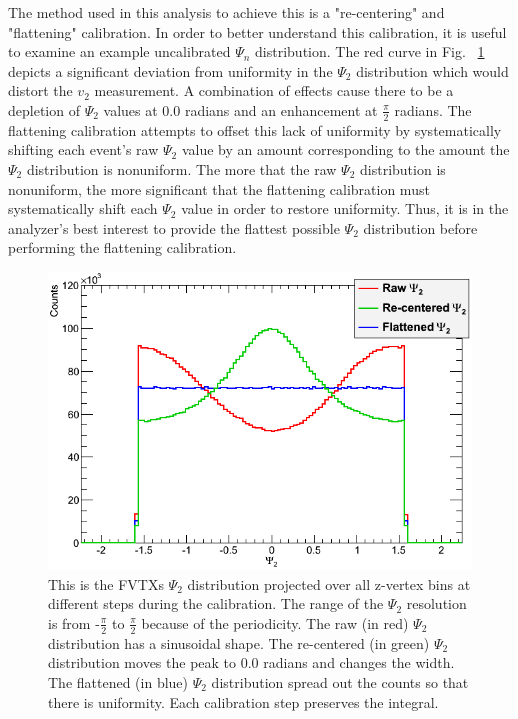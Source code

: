 The method used in this analysis to achieve this is a "re-centering" and "flattening" calibration. In order to better understand this calibration, it is useful to examine an example uncalibrated $\Psi_n$ distribution.
The red curve in Fig. ~\ref{fig:calibrated_psi} depicts a significant deviation from uniformity in the $\Psi_2$ distribution which would distort the $v_2$ measurement. 
A combination of effects cause there to be a depletion of $\Psi_2$ values at 0.0 radians and an enhancement at $\frac{\pi}{2}$ radians. The flattening calibration attempts to offset this 
lack of uniformity by systematically shifting each event's raw $\Psi_2$ value by an amount corresponding to the amount the $\Psi_2$ distribution is nonuniform. The more that the raw $\Psi_2$
distribution is nonuniform, the more significant that the flattening calibration must systematically shift each $\Psi_2$ value in order to restore uniformity. Thus, it is in the analyzer's best interest
to provide the flattest possible $\Psi_2$ distribution before performing the flattening calibration.
\begin{figure}[!h]
\begin{center}
\includegraphics[width=0.65\linewidth]{figs/flattened_example.png}
\caption{This is the FVTXs $\Psi_2$ distribution projected over all z-vertex bins at different steps during the calibration. The range of the $\Psi_2$ resolution is from -$\frac{\pi}{2}$ to $\frac{\pi}{2}$ because of the periodicity. 
The raw (in red) $\Psi_2$ distribution has a sinusoidal shape. The re-centered (in green) $\Psi_2$ distribution moves the peak to 0.0 radians and changes the width. The flattened (in blue) 
$\Psi_2$ distribution spread out the counts so that there is uniformity. Each calibration step preserves the integral.}
\end{center}
\label{fig:calibrated_psi}
\end{figure}

